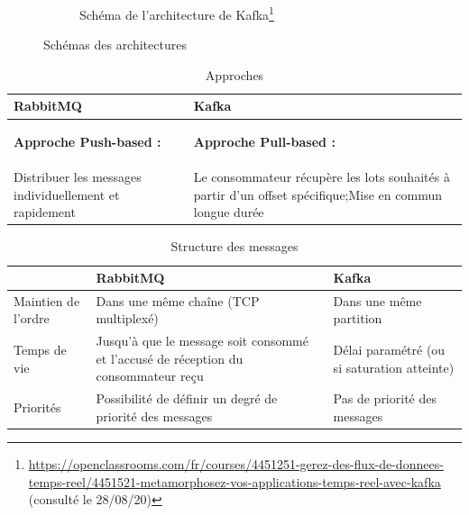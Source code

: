 \documentclass[11pt]{article}
\begin{document}
\begin{figure}
\begin{subfigure}{0.5\textwidth}
					\caption{Schéma de l'architecture de Kafka\footnote{\href{https://openclassrooms.com/fr/courses/4451251-gerez-des-flux-de-donnees-temps-reel/4451521-metamorphosez-vos-applications-temps-reel-avec-kafka}{https://openclassrooms.com/fr/courses/4451251-gerez-des-flux-de-donnees-temps-reel/4451521-metamorphosez-vos-applications-temps-reel-avec-kafka} (consulté le 28/08/20)}}
					\label{fig:archikafka}
				\end{subfigure}
				\caption{Schémas des architectures}
				\label{fig:comparatifarchi}
			\end{figure}
			\medskip
			\begin{table}
				\begin{tabular}{|p{7.5cm}|p{7.5cm}|}
				\hline
				\rowcolor{lightgray} RabbitMQ & Kafka\\\hline
				\begin{center} \textbf{Approche Push-based :}\end{center} & \begin{center} \textbf{Approche Pull-based :}\end{center}\\\hline
				Distribuer les messages individuellement et rapidement & Le consommateur récupère les lots souhaités à partir d’un offset spécifique;\newline Mise en commun longue durée\\\hline
				\end{tabular}
				\caption{Approches}
				\label{tab:comparatifapp}
			\end{table}
			\medskip
			\begin{table}
				\begin{tabular}{|p{3cm}|p{6cm}|p{6cm}|}
					\hline
					\rowcolor{lightgray} & RabbitMQ & Kafka\\\hline
					Maintien de l'ordre & Dans une même chaîne (TCP multiplexé) & Dans une même partition\\\hline
					Temps de vie & Jusqu’à que le message soit consommé et l'accusé de réception du consommateur reçu & Délai paramétré (ou si saturation atteinte)\\\hline
					Priorités & Possibilité de définir un degré de priorité des messages & Pas de priorité des messages \\\hline
				\end{tabular}
				\caption{Structure des messages}
				\label{tab:comparatifmess}
			\end{table}
			\medskip
\end{document}
